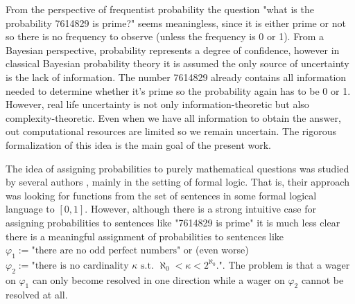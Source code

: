 \documentclass{article}
\theoremstyle{definition}
\theoremstyle{plain}
\begin{document}
From the perspective of frequentist probability the question "what is the probability 7614829 is prime?" seems meaningless, since it is either prime or not so there is no frequency to observe (unless the frequency is 0 or 1). From a Bayesian perspective, probability represents a degree of confidence, however in classical Bayesian probability theory it is assumed the only source of uncertainty is the lack of information. The number 7614829 already contains all information needed to determine whether it's prime so the probability again has to be 0 or 1. However, real life uncertainty is not only information-theoretic but also complexity-theoretic. Even when we have all information to obtain the answer, out computational resources are limited so we remain uncertain. The rigorous formalization of this idea is the main goal of the present work.

The idea of assigning probabilities to purely mathematical questions was studied by several authors \cite{Gaifman_2004}\cite{Hutter_2013}\cite{Demski_2012}\cite{Christiano_2014}\cite{Garrabrant_2015}, mainly in the setting of formal logic. That is, their approach was looking for functions from the set of sentences in some formal logical language to $[0,1]$. However, although there is a strong intuitive case for assigning probabilities to sentences like "7614829 is prime" it is much less clear there is a meaningful assignment of probabilities to sentences like $\varphi_1 := \text{"there are no odd perfect numbers"}$ or (even worse) $\varphi_2 := \text{"there is no cardinality } \kappa \text{ s.t. } \aleph_0 < \kappa < 2^{\aleph_0} \text{."}$. The problem is that a wager on $\varphi_1$ can only become resolved in one direction while a wager on $\varphi_2$ cannot be resolved at all.
\end{document}
